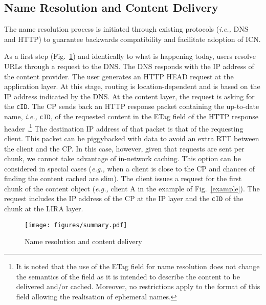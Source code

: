 \documentclass{sig-alternate}
\newcommand*\circled[1]{\tikz[baseline=(char.base)]{
            \node[shape=circle,draw,inner sep=2pt] (char) {#1};}}
\newcommand{\ie}{{\em i.e.,\/ }}
\newcommand{\eg}{{\em e.g.,\/ }}
\begin{document}
\subsection{Name Resolution and Content Delivery}\label{resolution}

The name resolution process is initiated through existing protocols (\ie DNS and HTTP) to guarantee backwards compatibility and facilitate adoption of ICN.

\circled{1} As a first step (Fig.~\ref{fig:summary}) and identically to what is happening today, users resolve URLs
through a request to the DNS.
\circled{2} The DNS responds with the IP address of the content provider.
\circled{3} The user generates an HTTP HEAD request \cite{rfc2616} at the application layer. At this stage, routing is location-dependent and is based on the IP address indicated by the DNS. At the content layer, the request is asking for the \texttt{cID}.
\circled{4} The CP sends back an HTTP response packet containing the up-to-date name, \ie \texttt{cID}, of the requested content in the ETag field of the HTTP response header \cite{rfc2616}.\footnote{It is noted that the use of the ETag field for name resolution does not change the semantics of the field as it is intended to describe the content to be delivered and/or cached. Moreover, no restrictions apply to the format of this field allowing the realisation of ephemeral names.} The destination IP address of that packet is that of the requesting client. This packet can be piggybacked with data to avoid an extra RTT between the client and the CP. In this case, however, given that requests are sent per chunk, we cannot take advantage of in-network caching. This option can be considered in special cases (\eg when a client is close to the CP and chances of finding the content cached are slim).
\circled{5} The client issues a request for the first chunk of the content object (\eg client A in the example of Fig.~\ref{example}). The request includes the IP address of the CP at the IP layer and the \texttt{cID} of the chunk at the LIRA layer.

\begin{figure} [!t]
\begin{center}
	\texttt{[image: figures/summary.pdf]}\vspace{-0.3cm}
	\caption{Name resolution and content delivery}
	\label{fig:summary}    
\end{center}
\end{figure}
\end{document}

